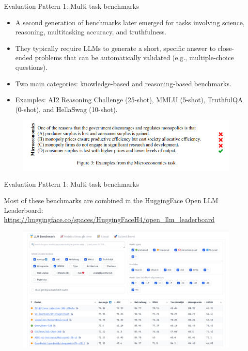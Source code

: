 \documentclass[handout]{beamer}
\begin{document}
\begin{frame}{Evaluation Pattern 1: Multi-task benchmarks }
\begin{scriptsize}
\begin{itemize}
\item A second generation of benchmarks later emerged for tasks involving science, reasoning, multitasking accuracy, and truthfulness.
\item They typically require LLMs to generate a short, specific answer to close-ended problems that can be automatically validated (e.g., multiple-choice questions).
\item Two main categories: knowledge-based and reasoning-based benchmarks.
\item  Examples: AI2 Reasoning Challenge (25-shot), MMLU (5-shot), TruthfulQA (0-shot), and HellaSwag (10-shot).

\end{itemize}
\end{scriptsize}
      \begin{figure}[h]
	\includegraphics[scale = 0.5]{pics/MMLU.png}
\end{figure}

\end{frame}




\begin{frame}{Evaluation Pattern 1: Multi-task benchmarks}
\begin{scriptsize}
Most of these benchmarks are combined in the HuggingFace Open LLM Leaderboard: \url{https://huggingface.co/spaces/HuggingFaceH4/open_llm_leaderboard}
\end{scriptsize}
      \begin{figure}[h]
	\includegraphics[scale = 0.18]{pics/openLLMbenchmark.png}
\end{figure}

\end{frame}
\end{document}
